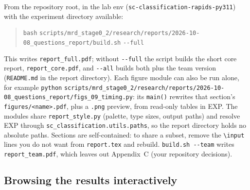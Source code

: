From the repository root, in the lab env (\nolinkurl{sc-classification-rapids-py311}) with the experiment directory available:
\begin{quote}\raggedright
\texttt{bash} \nolinkurl{scripts/mrd_stage0_2/research/reports/2026-10-08_questions_report/build.sh} \texttt{-{}-full}
\end{quote}
This writes \texttt{report\_full.pdf}; without \texttt{-{}-full} the script builds the short core report, \texttt{report\_core.pdf}, and \texttt{-{}-all} builds both plus the team version (\texttt{README.md} in the report directory).
Each figure module can also be run alone, for example \texttt{python} \nolinkurl{scripts/mrd_stage0_2/research/reports/2026-10-08_questions_report/figs_09_timing.py}: its \texttt{main()} rewrites that section's \texttt{figures/<name>.pdf}, plus a \texttt{.png} preview, from read-only tables in EXP. The modules share \texttt{report\_style.py} (palette, type sizes, output paths) and resolve EXP through \nolinkurl{sc_classification.utils.paths}, so the report directory holds no absolute paths. Sections are self-contained: to share a subset, remove the \texttt{\textbackslash input} lines you do not want from \texttt{report.tex} and rebuild. \texttt{build.sh -{}-team} writes \texttt{report\_team.pdf}, which leaves out Appendix~C (your repository decisions).

\subsection*{Browsing the results interactively}

